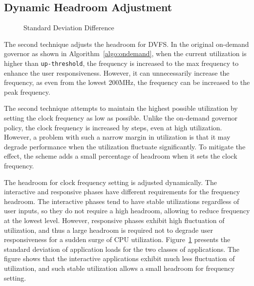 

\subsection{Dynamic Headroom Adjustment}

\begin{figure}[bt]
\begin{center}
\vspace{-0.2in}
\end{center}
\caption{Standard Deviation Difference}
\label{fig:stdv_phase}
\end{figure}

The second technique adjusts the headroom for DVFS. In the original on-demand 
governor as shown in Algorithm~\ref{algo:ondemand}, when the current utilization is higher than
{\tt up-threshold}, the frequency is increased to the max frequency to enhance the user responsiveness.
However, it can unnecessarily increase the frequency, as even from the lowest 200MHz,
the frequency can be increased to the peak frequency.

The second technique attempts to maintain the highest possible utilization by
setting the clock frequency as low as possible. Unlike the on-demand governor 
policy, the clock frequency is increased by steps, even at high utilization.
However, a problem with such
a narrow margin in utilization is that it may degrade performance when the
utilization fluctuate significantly. To mitigate the effect, the scheme adds 
a small percentage of headroom when it sets the clock frequency.

The headroom for clock frequency setting is adjusted dynamically.
The interactive and responsive phases have different requirements for the 
frequency headroom. The interactive phases tend to have stable utilizations regardless
of user inputs, so they do not require a high headroom, allowing to reduce 
frequency at the lowest level. 
However, responsive phases exhibit high fluctuation of utilization,
and thus a large headroom is required not to degrade user responsiveness for a sudden surge
of CPU utilization. Figure~\ref{fig:stdv_phase} presents the standard deviation of
application loads for the two classes of applications. The figure shows that
the interactive applications exhibit much less fluctuation of utilization, and
such stable utilization allows a small headroom for frequency setting.

